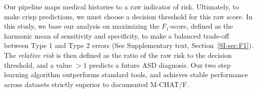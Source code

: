 \documentclass[3p,super,numbers,sort&compress,10pt]{elsarticle}
\begin{document}
Our pipeline maps medical histories to a   raw indicator of 
risk. Ultimately, to make crisp predictions, we must choose  a decision threshold for this raw score. %
In this study, we base our analysis on maximizing the $F_1$-score, defined as the harmonic mean of sensitivity and specificity, to make a   balanced trade-off between Type 1 and Type 2 errors (See Supplementary text, Section~\ref{SI-sec:F1}). The \textit{relative risk} is then defined as the ratio of the raw  risk to the  decision threshold, and a value  $>1$  predicts a future ASD diagnosis. Our two step learning algorithm outperforms standard tools, and achieves  stable performance across datasets strictly superior to documented M-CHAT/F.
%
\end{document}
